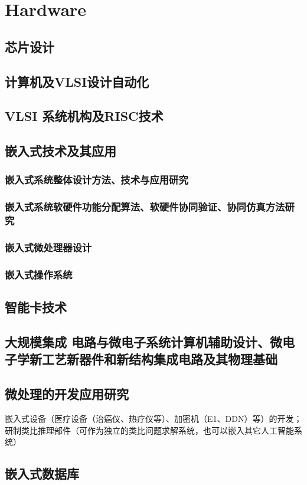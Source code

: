 

\chapter{Hardware}

\section{芯片设计}
\section{计算机及VLSI设计自动化}
\section{VLSI 系统机构及RISC技术}
\section{嵌入式技术及其应用}
\subsection{嵌入式系统整体设计方法、技术与应用研究}
\subsection{嵌入式系统软硬件功能分配算法、软硬件协同验证、协同仿真方法研究}
\subsection{嵌入式微处理器设计}
\subsection{嵌入式操作系统}



\section{智能卡技术}
\section{大规模集成 电路与微电子系统计算机辅助设计、微电子学新工艺新器件和新结构集成电路及其物理基础}


\section{微处理的开发应用研究}

嵌入式设备（医疗设备（治癌仪、热疗仪等）、加密机（E1、DDN）等）的开发；研制类比推理部件（可作为独立的类比问题求解系统，也可以嵌入其它人工智能系统）

\section{嵌入式数据库}


